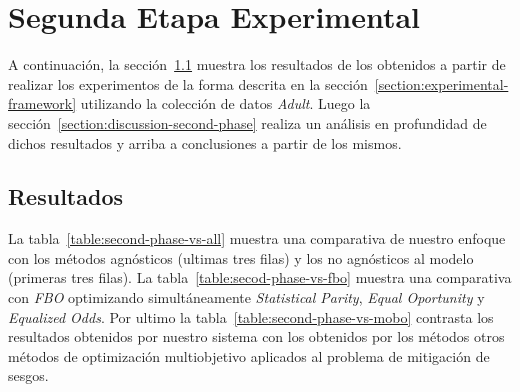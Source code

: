 \section{Segunda Etapa Experimental}\label{section:experiments-second-phase}

A continuación, la sección~\ref{section:results-second-phase} muestra los resultados de los obtenidos a partir de realizar los experimentos de la forma descrita en la sección~\ref{section:experimental-framework} utilizando la colección de datos \emph{Adult}.
Luego la sección~\ref{section:discussion-second-phase} realiza un análisis en profundidad de dichos resultados y arriba a conclusiones a partir de los mismos.

\subsection{Resultados}\label{section:results-second-phase}

La tabla~\ref{table:second-phase-vs-all} muestra una comparativa de nuestro enfoque con los métodos agnósticos (ultimas tres filas) y los no agnósticos al modelo (primeras tres filas).
La tabla~\ref{table:secod-phase-vs-fbo} muestra una comparativa con \emph{FBO} optimizando simultáneamente \emph{Statistical Parity}, \emph{Equal Oportunity} y \emph{Equalized Odds}.
Por ultimo la tabla~\ref{table:second-phase-vs-mobo} contrasta los resultados obtenidos por nuestro sistema con los obtenidos por los métodos otros métodos de optimización multiobjetivo aplicados al problema de mitigación de sesgos.

